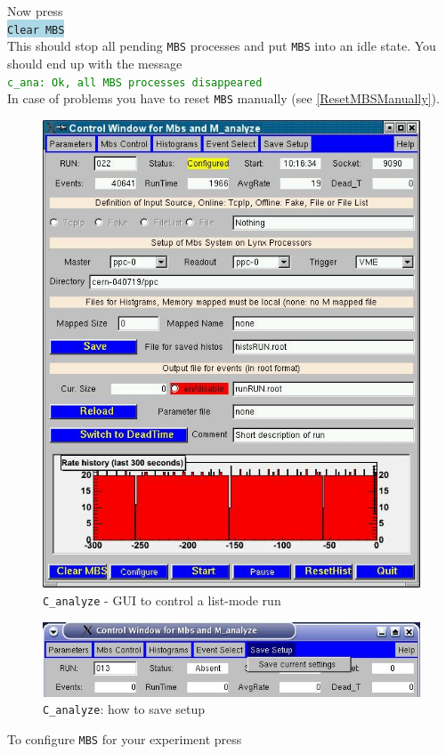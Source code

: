 \documentclass[10pt]{article}
\newcommand{\blue}[1]{\colorbox{lightblue}{\texttt{#1}}}
\newcommand{\greent}[1]{\textcolor{green}{\texttt{#1}}}
\begin{document}
Now press\\

\hspace*{.2\linewidth}\blue{Clear MBS}\\

This should stop all pending \texttt{MBS} processes and put \texttt{MBS} into an idle state.
You should end up with the message\\
\hspace*{.2\linewidth}\greent{c\_ana: Ok, all \texttt{MBS} processes disappeared}\\

In case of problems you have to reset \texttt{MBS} manually (see \ref{ResetMBSManually}).
\newpage
\begin{figure}[H]
\centerline{\includegraphics[width=.9\linewidth]{C_analyzeGUI}}
\caption{\texttt{C\_analyze} - GUI to control a list-mode run}
\label{CanalyzeGUI}
\end{figure}
\begin{figure}[H]
\centerline{\includegraphics[width=\linewidth]{C_analyzeSaveSetup}}
\caption{\texttt{C\_analyze}: how to save setup}
\label{CanalyzeSaveSetup}
\end{figure}
\newpage
To configure \texttt{MBS} for your experiment press\\
\end{document}
